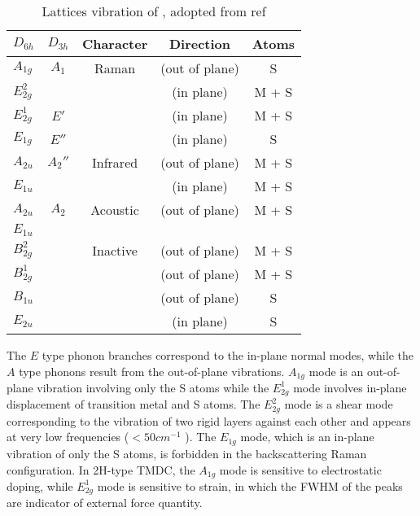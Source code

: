 \begin{table}[htb]
\centering
\caption{Lattices vibration of , adopted from ref\cite{Molina-Sanchez2011}}\label{tab:tmslattice}
\begin{tabular}{lcccc}
\toprule
 $D_{6h}$   & $D_{3h}$ & Character &  Direction & Atoms  \\
\midrule
$A_{1g}$    &  $A_1$   & Raman     & (out of plane)  & S  \\
$E_{2g}^2$  &          &           & (in plane)      & M + S  \\
$E_{2g}^1$  &  $E'$    &           & (in plane)      & M + S  \\
$E_{1g}$    &  $E''$    &           & (in plane)      & S  \\
\midrule
$A_{2u}$    &  $A_2''$  & Infrared  & (out of plane)  & M + S  \\
$E_{1u}$    &          &           & (in plane)      & M + S  \\
\midrule
$A_{2u}$    &  $A_2$   & Acoustic  & (out of plane)  & M + S  \\
$E_{1u}$    &          &           &       &    \\
\midrule
$B_{2g}^2$  &          & Inactive  & (out of plane)  & M + S  \\
$B_{2g}^1$  &          &           & (out of plane)  & M + S  \\
$B_{1u}$    &          &           & (out of plane)  & S  \\
$E_{2u}$    &          &           & (in plane)      & S  \\
\bottomrule
\end{tabular}
\end{table}

The $E$ type phonon branches correspond to the in-plane normal modes, while the $A$ type phonons result from the out-of-plane vibrations. $A_{1g}$ mode is an out-of-plane vibration involving only the S atoms while the $E_{2g}^1$ mode involves in-plane displacement of transition metal and S atoms. The $E_{2g}^2$ mode is a shear mode corresponding to the vibration of two rigid layers against
each other and appears at very low frequencies ($<50 cm^{-1}$ \cite{Zhang2013i}). The $E_{1g}$ mode, which is an in-plane vibration of only the S atoms, is forbidden in the backscattering Raman configuration. In 2H-type TMDC, the $A_{1g}$ mode is sensitive to electrostatic doping, while $E_{2g}^1$ mode is sensitive to strain, in which the FWHM of the peaks are indicator of external force quantity.

